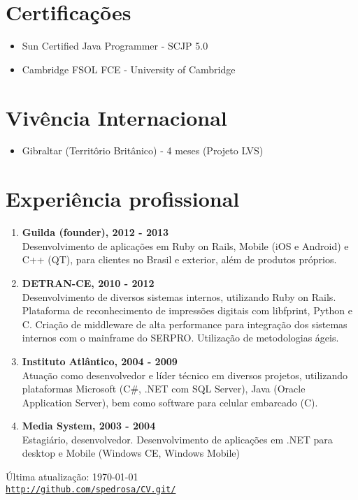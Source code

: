 \documentclass[letterpaper]{article}
\def\footerlink{http://github.com/spedrosa/CV.git/}
\begin{document}
\section*{Certificações}
\begin{itemize}
  \item Sun Certified Java Programmer - SCJP 5.0
  \item Cambridge FSOL FCE - University of Cambridge
\end{itemize}

\section*{Vivência Internacional}
\begin{itemize}
  \item Gibraltar (Territôrio Britânico) - 4 meses (Projeto LVS)
\end{itemize}

\section*{Experiência profissional}

\begin{enumerate}
  \item 
  \textbf{Guilda (founder), 2012 - 2013 } \\
  Desenvolvimento de aplicações em Ruby on Rails, Mobile (iOS e Android) e C++ (QT), para clientes no Brasil e exterior, além de produtos próprios.
  \item
  \textbf{DETRAN-CE, 2010 - 2012} \\
  Desenvolvimento de diversos sistemas internos, utilizando Ruby on Rails. Plataforma de reconhecimento de impressões digitais com libfprint, Python e C. Criação de middleware de alta performance para integração dos sistemas internos com o mainframe do SERPRO. Utilização de metodologias ágeis.
  \item
  \textbf{Instituto Atlântico, 2004 - 2009 } \\
  Atuação como desenvolvedor e líder técnico em diversos projetos, utilizando plataformas Microsoft (C\#, .NET com SQL Server), Java (Oracle Application Server), bem como software para celular embarcado (C). 
  \item
  \textbf{Media System, 2003 - 2004} \\
  Estagiário, desenvolvedor. Desenvolvimento de aplicações em .NET para desktop e Mobile (Windows CE, Windows Mobile)
\end{enumerate}

\bigskip

\begin{center}
  \begin{footnotesize}
    Última atualização: \today \\
    \href{\footerlink}{\texttt{\footerlink}}
  \end{footnotesize}
\end{center}
\end{document}
